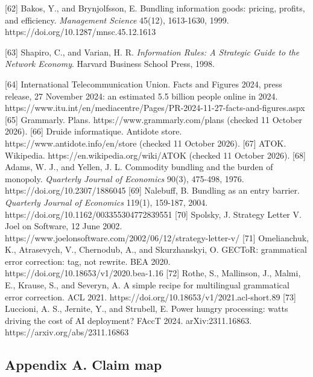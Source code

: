 \documentclass[
  10pt,
]{article}
\begin{document}
{[}62{]} Bakos, Y., and Brynjolfsson, E. Bundling information goods:
pricing, profits, and efficiency. \emph{Management Science} 45(12),
1613-1630, 1999. https://doi.org/10.1287/mnsc.45.12.1613

{[}63{]} Shapiro, C., and Varian, H. R. \emph{Information Rules: A
Strategic Guide to the Network Economy}. Harvard Business School Press,
1998.

{[}64{]} International Telecommunication Union. Facts and Figures 2024,
press release, 27 November 2024: an estimated 5.5 billion people online
in 2024.
https://www.itu.int/en/mediacentre/Pages/PR-2024-11-27-facts-and-figures.aspx
{[}65{]} Grammarly. Plans. https://www.grammarly.com/plans (checked 11
October 2026). {[}66{]} Druide informatique. Antidote store.
https://www.antidote.info/en/store (checked 11 October 2026). {[}67{]}
ATOK. Wikipedia. https://en.wikipedia.org/wiki/ATOK (checked 11 October
2026). {[}68{]} Adams, W. J., and Yellen, J. L. Commodity bundling and
the burden of monopoly. \emph{Quarterly Journal of Economics} 90(3),
475-498, 1976. https://doi.org/10.2307/1886045 {[}69{]} Nalebuff, B.
Bundling as an entry barrier. \emph{Quarterly Journal of Economics}
119(1), 159-187, 2004. https://doi.org/10.1162/003355304772839551
{[}70{]} Spolsky, J. Strategy Letter V. Joel on Software, 12 June 2002.
https://www.joelonsoftware.com/2002/06/12/strategy-letter-v/ {[}71{]}
Omelianchuk, K., Atrasevych, V., Chernodub, A., and Skurzhanskyi, O.
GECToR: grammatical error correction: tag, not rewrite. BEA 2020.
https://doi.org/10.18653/v1/2020.bea-1.16 {[}72{]} Rothe, S., Mallinson,
J., Malmi, E., Krause, S., and Severyn, A. A simple recipe for
multilingual grammatical error correction. ACL 2021.
https://doi.org/10.18653/v1/2021.acl-short.89 {[}73{]} Luccioni, A. S.,
Jernite, Y., and Strubell, E. Power hungry processing: watts driving the
cost of AI deployment? FAccT 2024. arXiv:2311.16863.
https://arxiv.org/abs/2311.16863

\subsection{Appendix A. Claim map}\label{appendix-a.-claim-map}
\end{document}
